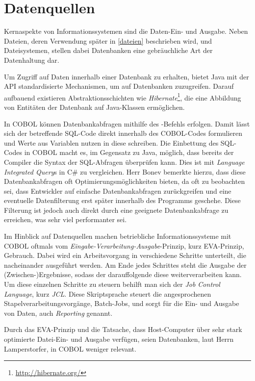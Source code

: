 \section{Datenquellen}\label{reporting}

Kernaspekte von Informationssystemen sind die Daten-Ein- und Ausgabe. Neben Dateien, deren Verwendung später in \autoref{dateien} beschrieben wird, und Dateisystemen, stellen dabei Datenbanken eine gebräuchliche Art der Datenhaltung dar.

Um Zugriff auf Daten innerhalb einer Datenbank zu erhalten, bietet Java mit der  API standardisierte Mechanismen, um auf Datenbanken zuzugreifen. Darauf aufbauend existieren Abstraktionsschichten wie \textit{Hibernate}\footnote{\url{http://hibernate.org/} \visitedOn}, die eine Abbildung von Entitäten der Datenbank auf Java-Klassen ermöglichen.

In COBOL können Datenbankabfragen mithilfe des -Befehls erfolgen. Damit lässt sich der betreffende SQL-Code direkt innerhalb des COBOL-Codes formulieren und Werte aus Variablen nutzen \bzw in diese schreiben. Die Einbettung des SQL-Codes in COBOL macht es, im Gegensatz zu Java, möglich, dass bereits der Compiler die Syntax der SQL-Abfragen überprüfen kann. Dies ist mit \textit{Language Integrated Query}s in C\# zu vergleichen. Herr Bonev bemerkte hierzu, dass diese Datenbankabfragen oft Optimierungsmöglichkeiten bieten, da oft zu beobachten sei, dass Entwickler auf einfache Datenbankabfragen zurückgreifen und eine eventuelle Datenfilterung erst später innerhalb des Programms geschehe. Diese Filterung ist jedoch auch direkt durch eine geeignete Datenbankabfrage zu erreichen, was sehr viel performanter sei. 

Im Hinblick auf Datenquellen machen betriebliche Informationssysteme mit COBOL oftmals vom \textit{Eingabe-Verarbeitung-Ausgabe}-Prinzip, kurz EVA-Prinzip, Gebrauch. Dabei wird ein Arbeitsvorgang in verschiedene Schritte unterteilt, die nacheinander ausgeführt werden. Am Ende jedes Schrittes steht die Ausgabe der (Zwischen-)Ergebnisse, sodass der darauffolgende diese weiterverarbeiten kann. Um diese einzelnen Schritte zu steuern behilft man sich der \textit{Job Control Language}, kurz \textit{JCL}. Diese Skriptsprache steuert die angesprochenen Stapelverarbeitungsvorgänge, \engl Batch-Jobs, und sorgt für die Ein- und Ausgabe von Daten, auch \textit{Reporting} genannt. 

Durch das EVA-Prinzip und die Tatsache, dass Host-Computer über sehr stark optimierte Datei-Ein- und Ausgabe verfügen, seien Datenbanken, laut Herrn Lamperstorfer, in COBOL weniger relevant.